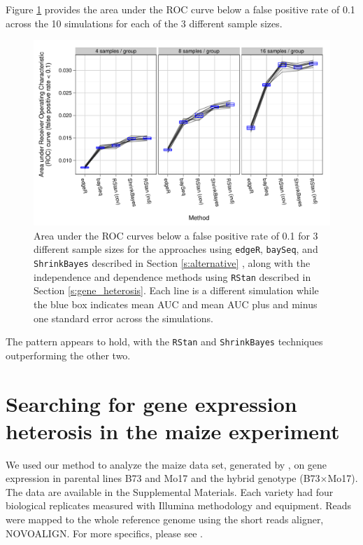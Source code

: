 \documentclass[useAMS,usenatbib,referee]{biom}
\newcommand{\RStan}{{\tt RStan}}
\newcommand{\edgeR}{{\tt edgeR}}
\newcommand{\ShrinkBayes}{{\tt ShrinkBayes}}
\begin{document}
Figure \ref{f:auc} provides the area under the ROC curve below a false positive rate of 0.1 across the 10 simulations for each of the 3 different sample sizes. 
\begin{figure}
\centerline{\includegraphics[width=\textwidth]{auc-facet-TRUE}}
\caption{Area under the ROC curves below a false positive rate of 0.1 for 3 different sample sizes for the approaches using \edgeR{}, {\tt baySeq},  and \ShrinkBayes{} described in Section \ref{s:alternative} , along with the independence and dependence methods using \RStan{} described in Section \ref{s:gene_heterosis}. Each line is a different simulation while the blue box indicates mean AUC and mean AUC plus and minus one standard error across the simulations.}
\label{f:auc}
\end{figure}
The pattern appears to hold, with the \RStan{} and \ShrinkBayes{} techniques outperforming the other two. %



\section{Searching for gene expression heterosis in the maize experiment}
\label{s:maize}

We used our method to analyze the maize data set, generated by \cite{paschold2012complementation}, on gene expression in parental lines B73 and Mo17 and the hybrid genotype (B73$\times$Mo17). The data are available in the Supplemental Materials. Each variety had four biological replicates measured with Illumina methodology and equipment. Reads were mapped to the whole reference genome using the short reads aligner, NOVOALIGN. For more specifics, please see \cite{paschold2012complementation}. 
\end{document}
